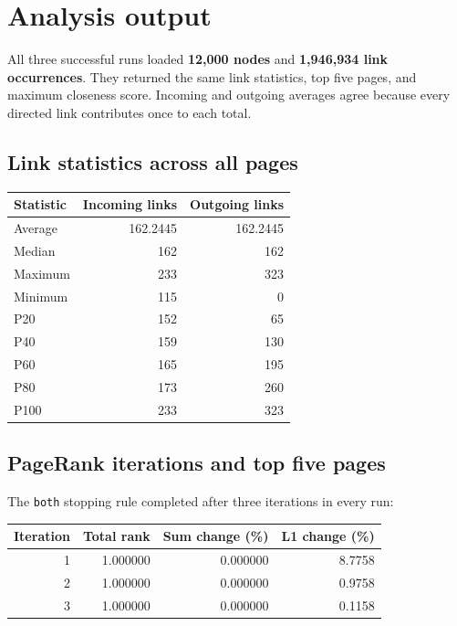 \documentclass[10pt,letterpaper]{article}
\begin{document}
\clearpage
\section{Analysis output}
All three successful runs loaded \textbf{12,000 nodes} and
\textbf{1,946,934 link occurrences}. They returned the same link statistics,
top five pages, and maximum closeness score. Incoming and outgoing averages
agree because every directed link contributes once to each total.

\subsection{Link statistics across all pages}
\begin{center}
\begin{tabular}{@{}lrr@{}}
\toprule Statistic & Incoming links & Outgoing links \\ \midrule
Average & 162.2445 & 162.2445 \\
Median & 162 & 162 \\
Maximum & 233 & 323 \\
Minimum & 115 & 0 \\
P20 & 152 & 65 \\
P40 & 159 & 130 \\
P60 & 165 & 195 \\
P80 & 173 & 260 \\
P100 & 233 & 323 \\
\bottomrule
\end{tabular}
\end{center}

\subsection{PageRank iterations and top five pages}
The \texttt{both} stopping rule completed after three iterations in every run:
\begin{center}
\begin{tabular}{@{}rrrr@{}}
\toprule Iteration & Total rank & Sum change (\%) & L1 change (\%) \\ \midrule
1 & 1.000000 & 0.000000 & 8.7758 \\
2 & 1.000000 & 0.000000 & 0.9758 \\
3 & 1.000000 & 0.000000 & 0.1158 \\
\bottomrule
\end{tabular}
\end{center}
\end{document}

